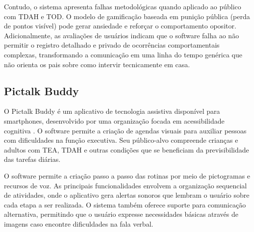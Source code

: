 \vspace{0.2cm}

Contudo, o sistema apresenta falhas metodológicas quando aplicado ao público com TDAH e TOD. O modelo de gamificação baseada em punição pública (perda de pontos visível) pode gerar ansiedade e reforçar o comportamento opositor. Adicionalmente, as avaliações de usuários indicam que o software falha ao não permitir o registro detalhado e privado de ocorrências comportamentais complexas, transformando a comunicação em uma linha do tempo genérica que não orienta os pais sobre como intervir tecnicamente em casa. 

\vspace{0.3cm}
\subsection{Pictalk Buddy}
 
 O Pictalk Buddy é um aplicativo de tecnologia assistiva disponível para smartphones, desenvolvido por uma organização focada em acessibilidade cognitiva \cite{pictalk2026}. O software permite a criação de agendas visuais para auxiliar pessoas com dificuldades na função executiva. Seu público-alvo compreende crianças e adultos com TEA, TDAH e outras condições que se beneficiam da previsibilidade das tarefas diárias.

O software permite a criação passo a passo das rotinas por meio de pictogramas e recursos de voz. As principais funcionalidades envolvem a organização sequencial de atividades, onde o aplicativo gera alertas sonoros que lembram o usuário sobre cada etapa a ser realizada. O sistema também oferece suporte para comunicação alternativa, permitindo que o usuário expresse necessidades básicas através de imagens caso encontre dificuldades na fala verbal.

